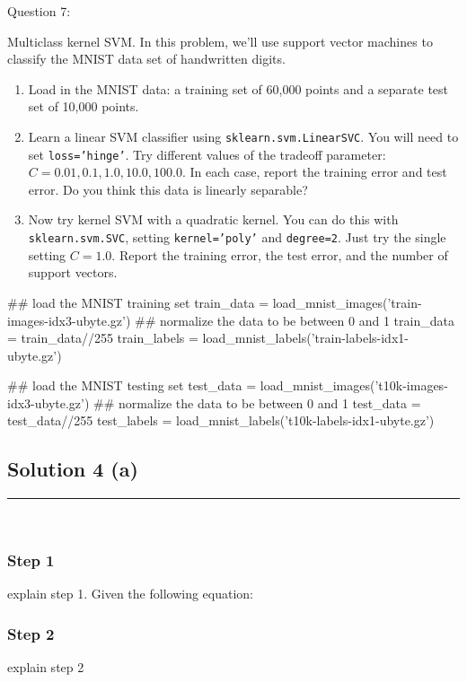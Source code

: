 Question 7:\item Multiclass kernel SVM. In this problem, we'll use support vector machines to classify the MNIST data set of handwritten digits.
\begin{enumerate}
    \item Load in the MNIST data: a training set of 60,000 points and a separate test set of 10,000 points.
    \item Learn a linear SVM classifier using \texttt{sklearn.svm.LinearSVC}. You will need to set \texttt{loss='hinge'}. Try different values of the tradeoff parameter: $C = 0.01, 0.1, 1.0, 10.0, 100.0$. In each case, report the training error and test error. Do you think this data is linearly separable?
    \item Now try kernel SVM with a quadratic kernel. You can do this with \texttt{sklearn.svm.SVC}, setting \texttt{kernel='poly'} and \texttt{degree=2}. Just try the single setting $C = 1.0$. Report the training error, the test error, and the number of support vectors.
\end{enumerate}
## load the MNIST training set
train_data = load_mnist_images('train-images-idx3-ubyte.gz')
## normalize the data to be between 0 and 1
train_data = train_data//255
train_labels = load_mnist_labels('train-labels-idx1-ubyte.gz')

## load the MNIST testing set
test_data = load_mnist_images('t10k-images-idx3-ubyte.gz')
## normalize the data to be between 0 and 1
test_data = test_data//255
test_labels = load_mnist_labels('t10k-labels-idx1-ubyte.gz')
\subsection*{Solution 4 (a)}
\noindent\rule{\textwidth}{0.4pt}\\

\subsubsection*{Step 1}
\parbox{\textwidth}{

explain step 1.
Given the following equation:\\

}

\subsubsection*{Step 2}
\parbox{\textwidth}{

explain step 2\\

}

